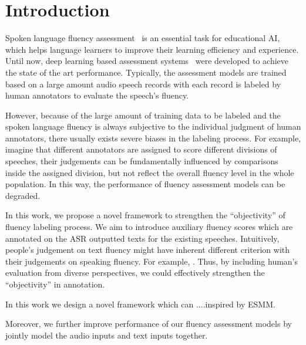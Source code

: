 
\section{Introduction}



Spoken language fluency assessment~\cite{aldhanhani2020theories} is an essential task for educational AI, which helps language learners to improve their learning efficiency and experience. Until now, deep learning based assessment systems~\cite{metallinou2014using, cheng2015deep} were developed to achieve the state of the art performance. Typically, the assessment models are trained based on a large amount audio speech records with each record is labeled by human annotators to evaluate the speech's fluency. 


However, because of the large amount of training data to be labeled and the spoken language fluency is always subjective to the individual judgment of human annotators, there usually exists severe biases in the labeling process. For example, imagine that different annotators are assigned to score different divisions of speeches, their judgements can be fundamentally influenced by comparisons inside the assigned division, but
not reflect the overall fluency level in the whole population. In this way, the performance of fluency assessment models can be degraded.



In this work, we propose a novel framework to strengthen the ``objectivity'' of fluency labeling process. We aim to introduce auxiliary fluency scores which are annotated on the ASR outputted texts for the existing speeches. Intuitively, people's judgement on text fluency might have inherent different criterion with their judgements on speaking fluency. For example, . Thus, by including human's evaluation from diverse perspectives, we could effectively strengthen the ``objectivity'' in annotation. 

In this work we design a novel framework which can ....inspired by ESMM.


Moreover, we further improve performance of our fluency assessment models by jointly model the audio inputs and text inputs together. 

